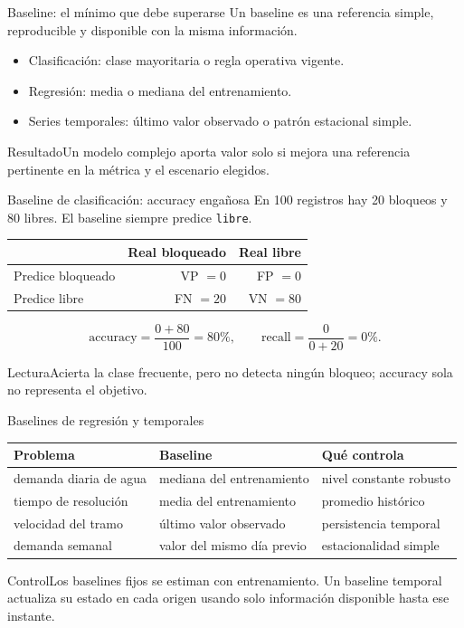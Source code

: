 \documentclass[aspectratio=169,10pt]{beamer}
\begin{document}
\begin{frame}{Baseline: el mínimo que debe superarse}
  \small Un baseline es una referencia simple, reproducible y disponible con la misma información.
  \begin{itemize}
    \item Clasificación: clase mayoritaria o regla operativa vigente.
    \item Regresión: media o mediana del entrenamiento.
    \item Series temporales: último valor observado o patrón estacional simple.
  \end{itemize}
  \begin{block}{Resultado}Un modelo complejo aporta valor solo si mejora una referencia pertinente en la métrica y el escenario elegidos.\end{block}
\end{frame}

\begin{frame}{Baseline de clasificación: accuracy engañosa}
  \small En 100 registros hay 20 bloqueos y 80 libres. El baseline siempre predice \texttt{libre}.
  \begin{center}\begin{tabular}{lrr}\toprule
   & Real bloqueado & Real libre\\\midrule
  Predice bloqueado & VP $=0$ & FP $=0$\\ Predice libre & FN $=20$ & VN $=80$\\\bottomrule
  \end{tabular}\end{center}
  \[\mathrm{accuracy}=\frac{0+80}{100}=80\%,\qquad \mathrm{recall}=\frac{0}{0+20}=0\%.\]
  \begin{alertblock}{Lectura}Acierta la clase frecuente, pero no detecta ningún bloqueo; accuracy sola no representa el objetivo.\end{alertblock}
\end{frame}

\begin{frame}{Baselines de regresión y temporales}
  \scriptsize
  \begin{tabularx}{\textwidth}{p{}p{}X}\toprule
  \textbf{Problema} & \textbf{Baseline} & \textbf{Qué controla}\\\midrule
  demanda diaria de agua & mediana del entrenamiento & nivel constante robusto\\
  tiempo de resolución & media del entrenamiento & promedio histórico\\
  velocidad del tramo & último valor observado & persistencia temporal\\
  demanda semanal & valor del mismo día previo & estacionalidad simple\\\bottomrule
  \end{tabularx}
  \begin{block}{Control}Los baselines fijos se estiman con entrenamiento. Un baseline temporal actualiza su estado en cada origen usando solo información disponible hasta ese instante.\end{block}
\end{frame}
\end{document}
